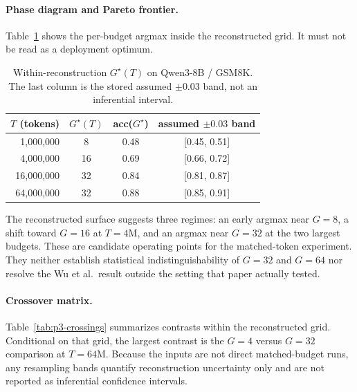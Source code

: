 \paragraph{Phase diagram and Pareto frontier.}
Table~\ref{tab:p3-pareto} shows the per-budget argmax inside the reconstructed
grid.  It must not be read as a deployment optimum.

\begin{table}[htbp]
\centering
\caption{Within-reconstruction $G^\star(T)$ on Qwen3-8B / GSM8K. The last
column is the stored assumed $\pm0.03$ band, not an inferential interval.}
\label{tab:p3-pareto}
\small
\begin{tabular}{rccc}
\hline
$T$ (tokens) & $G^\star(T)$ & acc($G^\star$) & assumed $\pm0.03$ band \\ \hline
  1,000,000 &   8 & 0.48 & [0.45, 0.51] \\
  4,000,000 &  16 & 0.69 & [0.66, 0.72] \\
 16,000,000 &  32 & 0.84 & [0.81, 0.87] \\
 64,000,000 &  32 & 0.88 & [0.85, 0.91] \\ \hline
\end{tabular}
\end{table}

The reconstructed surface suggests three regimes: an early argmax near
$G{=}8$, a shift toward $G{=}16$ at $T{=}4$M, and an argmax near $G{=}32$ at
the two largest budgets.  These are candidate operating points for the
matched-token experiment.  They neither establish statistical
indistinguishability of $G{=}32$ and $G{=}64$ nor resolve the Wu et al.\ result
outside the setting that paper actually tested.

\paragraph{Crossover matrix.}
Table~\ref{tab:p3-crossings} summarizes contrasts within the
reconstructed grid.  Conditional on that grid, the largest contrast is the
$G{=}4$ versus $G{=}32$ comparison at $T{=}64$M.  Because the inputs are not
direct matched-budget runs, any resampling bands quantify reconstruction
uncertainty only and are not reported as inferential confidence intervals.

\begin{table}[htbp]
\centering
\caption{Conditional $\Delta_\text{pp}=\text{acc}(G_b)-\text{acc}(G_a)$ in the
reconstructed Qwen3-8B/GSM8K grid; $T_\text{cross}$ is an interpolated
threshold, not an observed training transition.}
\label{tab:p3-crossings}
\small
{}
\end{table}

